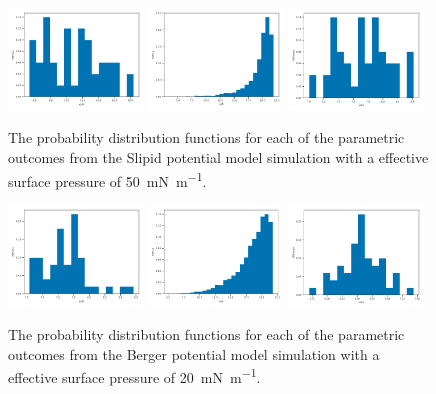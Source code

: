 \documentclass[amsmath,amssymb,superscriptaddress]{revtex4-1}
\begin{document}
%
%
\begin{figure}
 \centering
 \includegraphics[width=0.32\textwidth]{slipids_50_dh}
 \includegraphics[width=0.32\textwidth]{slipids_50_tt}
 \includegraphics[width=0.32\textwidth]{slipids_50_wph}
 \caption{The probability distribution functions for each of the parametric outcomes from the Slipid potential model simulation with a effective surface pressure of \SI{50}{\milli\newton\per\meter}.}
 \label{fig:sl50}
\end{figure}
%
%
\begin{figure}
 \centering
 \includegraphics[width=0.32\textwidth]{berger_20_dh}
 \includegraphics[width=0.32\textwidth]{berger_20_tt}
 \includegraphics[width=0.32\textwidth]{berger_20_wph}
 \caption{The probability distribution functions for each of the parametric outcomes from the Berger potential model simulation with a effective surface pressure of \SI{20}{\milli\newton\per\meter}.}
 \label{fig:be20}
\end{figure}
\end{document}
